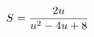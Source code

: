 \documentclass[preview]{standalone}
\begin{document}
\begin{align*}
\special{dvisvgm:raw <g id='unique000'>}S=\frac{2u}{u^2-4u+8}\special{dvisvgm:raw </g>}
\end{align*}
\end{document}
